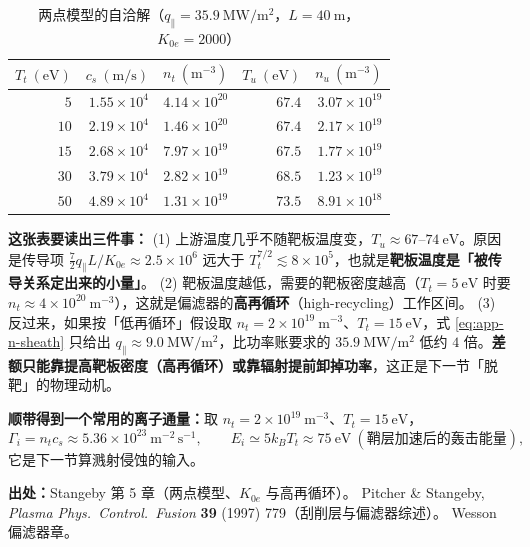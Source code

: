 \begin{table}[htbp]
\centering
\small
\caption{两点模型的自洽解（$q_\parallel=35.9\ \mathrm{MW/m^2}$，$L=40\ \mathrm{m}$，$K_{0e}=2000$）}
\label{tab:app-n-twopoint}
\begin{tabular}{@{}rrrrr@{}}
\toprule
$T_t\ (\mathrm{eV})$ & $c_s\ (\mathrm{m/s})$ & $n_t\ (\mathrm{m^{-3}})$ & $T_u\ (\mathrm{eV})$ & $n_u\ (\mathrm{m^{-3}})$ \\
\midrule
$5$  & $1.55\times10^{4}$ & $4.14\times10^{20}$ & $67.4$ & $3.07\times10^{19}$ \\
$10$ & $2.19\times10^{4}$ & $1.46\times10^{20}$ & $67.4$ & $2.17\times10^{19}$ \\
$15$ & $2.68\times10^{4}$ & $7.97\times10^{19}$ & $67.5$ & $1.77\times10^{19}$ \\
$30$ & $3.79\times10^{4}$ & $2.82\times10^{19}$ & $68.5$ & $1.23\times10^{19}$ \\
$50$ & $4.89\times10^{4}$ & $1.31\times10^{19}$ & $73.5$ & $8.91\times10^{18}$ \\
\bottomrule
\end{tabular}
\end{table}

\textbf{这张表要读出三件事：}
(1) 上游温度几乎不随靶板温度变，$T_u\approx67$--$74\ \mathrm{eV}$。原因是传导项 $\frac72q_\parallel L/K_{0e}\approx2.5\times10^{6}$ 远大于 $T_t^{7/2}\lesssim8\times10^{5}$，也就是\textbf{靶板温度是「被传导关系定出来的小量」}。
(2) 靶板温度越低，需要的靶板密度越高（$T_t=5\ \mathrm{eV}$ 时要 $n_t\approx4\times10^{20}\ \mathrm{m^{-3}}$），这就是偏滤器的\textbf{高再循环}（high-recycling）工作区间。
(3) 反过来，如果按「低再循环」假设取 $n_t=2\times10^{19}\ \mathrm{m^{-3}}$、$T_t=15\ \mathrm{eV}$，式 \eqref{eq:app-n-sheath} 只给出 $q_\parallel\approx9.0\ \mathrm{MW/m^2}$，比功率账要求的 $35.9\ \mathrm{MW/m^2}$ 低约 $4$ 倍。\textbf{差额只能靠提高靶板密度（高再循环）或靠辐射提前卸掉功率}，这正是下一节「脱靶」的物理动机。

\textbf{顺带得到一个常用的离子通量：}取 $n_t=2\times10^{19}\ \mathrm{m^{-3}}$、$T_t=15\ \mathrm{eV}$，
\begin{equation}
\Gamma_i=n_tc_s\approx5.36\times10^{23}\ \mathrm{m^{-2}\,s^{-1}},
\qquad
E_i\simeq5k_BT_t\approx75\ \mathrm{eV}\ (\text{鞘层加速后的轰击能量}),
\end{equation}
它是下一节算溅射侵蚀的输入。

{\footnotesize
\textbf{出处：}Stangeby 第 5 章（两点模型、$K_{0e}$ 与高再循环）。
Pitcher \& Stangeby, \textit{Plasma Phys.\ Control.\ Fusion} \textbf{39} (1997) 779（刮削层与偏滤器综述）。
Wesson 偏滤器章。
}


